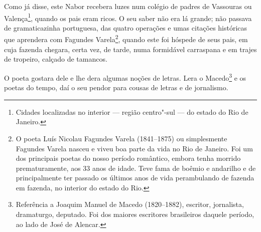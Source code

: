 Como já disse, este Nabor recebera luzes num colégio de padres de
Vassouras ou Valença\footnote{Cidades localizadas no interior --- região
  centro"-sul --- do estado do Rio de Janeiro.}, quando os pais eram
ricos. O seu saber não era lá grande; não passava de gramaticazinha
portuguesa, das quatro operações e umas citações históricas que
aprendera com Fagundes Varela\footnote{O poeta Luís Nicolau Fagundes
  Varela (1841--1875) ou simplesmente Fagundes Varela nasceu e viveu
  boa parte da vida no Rio de Janeiro. Foi um dos principais poetas do
  nosso período romântico, embora tenha morrido prematuramente, aos 33
  anos de idade. Teve fama de boêmio e andarilho e de principalmente ter
  passado os últimos anos de vida perambulando de fazenda em fazenda, no
  interior do estado do Rio.}, quando este foi hóspede de seus pais, em
cuja fazenda chegara, certa vez, de tarde, numa formidável carraspana e
em trajes de tropeiro, calçado de tamancos.

O poeta gostara dele e lhe dera algumas noções de letras. Lera o
Macedo\footnote{Referência a Joaquim Manuel de Macedo (1820--1882),
  escritor, jornalista, dramaturgo, deputado. Foi dos maiores escritores
  brasileiros daquele período, ao lado de José de Alencar.} e os poetas
do tempo, daí o seu pendor para cousas de letras e de jornalismo.


